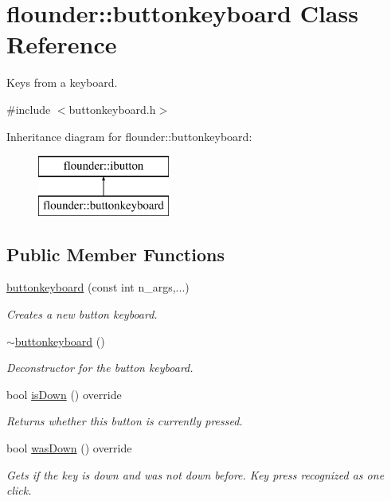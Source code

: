 \hypertarget{classflounder_1_1buttonkeyboard}{}\section{flounder\+:\+:buttonkeyboard Class Reference}
\label{classflounder_1_1buttonkeyboard}


Keys from a keyboard.  




{\ttfamily \#include $<$buttonkeyboard.\+h$>$}

Inheritance diagram for flounder\+:\+:buttonkeyboard\+:\begin{figure}[H]
\begin{center}
\leavevmode
\includegraphics[height=2.000000cm]{classflounder_1_1buttonkeyboard}
\end{center}
\end{figure}
\subsection*{Public Member Functions}
\begin{DoxyCompactItemize}
\item 
\hyperlink{classflounder_1_1buttonkeyboard_a1cb133f346df9c1f0f401574bde868bc}{buttonkeyboard} (const int n\+\_\+args,...)
\begin{DoxyCompactList}\small\item\em Creates a new button keyboard. \end{DoxyCompactList}\item 
\hyperlink{classflounder_1_1buttonkeyboard_a76e965d16462442aaae33fe6fd2421ea}{$\sim$buttonkeyboard} ()
\begin{DoxyCompactList}\small\item\em Deconstructor for the button keyboard. \end{DoxyCompactList}\item 
bool \hyperlink{classflounder_1_1buttonkeyboard_a432555049251cec48431e4f14b6aa34b}{is\+Down} () override
\begin{DoxyCompactList}\small\item\em Returns whether this button is currently pressed. \end{DoxyCompactList}\item 
bool \hyperlink{classflounder_1_1buttonkeyboard_abc6b3c8cf9398f2a896408e390fd3a01}{was\+Down} () override
\begin{DoxyCompactList}\small\item\em Gets if the key is down and was not down before. Key press recognized as one click. \end{DoxyCompactList}\end{DoxyCompactItemize}
